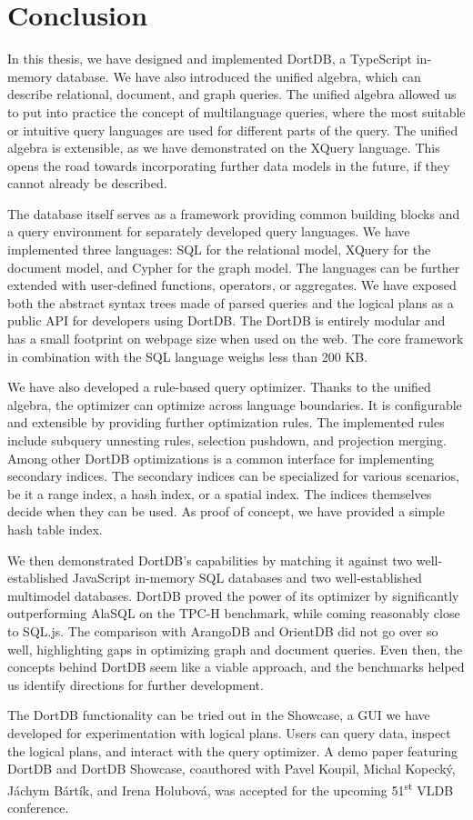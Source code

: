 \chapter*{Conclusion}

In this thesis, we have designed and implemented DortDB, a TypeScript in-memory database. We have also introduced the unified algebra, which can describe relational, document, and graph queries. The unified algebra allowed us to put into practice the concept of multilanguage queries, where the most suitable or intuitive query languages are used for different parts of the query. The unified algebra is extensible, as we have demonstrated on the XQuery language. This opens the road towards incorporating further data models in the future, if they cannot already be described.

The database itself serves as a framework providing common building blocks and a query environment for separately developed query languages. We have implemented three languages: SQL for the relational model, XQuery for the document model, and Cypher for the graph model. The languages can be further extended with user-defined functions, operators, or aggregates. We have exposed both the abstract syntax trees made of parsed queries and the logical plans as a public API for developers using DortDB. The DortDB is entirely modular and has a small footprint on webpage size when used on the web. The core framework in combination with the SQL language weighs less than 200 KB.

We have also developed a rule-based query optimizer. Thanks to the unified algebra, the optimizer can optimize across language boundaries. It is configurable and extensible by providing further optimization rules. The implemented rules include subquery unnesting rules, selection pushdown, and projection merging. Among other DortDB optimizations is a common interface for implementing secondary indices. The secondary indices can be specialized for various scenarios, be it a range index, a hash index, or a spatial index. The indices themselves decide when they can be used. As proof of concept, we have provided a simple hash table index.

We then demonstrated DortDB's capabilities by matching it against two well-established JavaScript in-memory SQL databases and two well-established multimodel databases. DortDB proved the power of its optimizer by significantly outperforming AlaSQL on the TPC-H benchmark, while coming reasonably close to SQL.js. The comparison with ArangoDB and OrientDB did not go over so well, highlighting gaps in optimizing graph and document queries. Even then, the concepts behind DortDB seem like a viable approach, and the benchmarks helped us identify directions for further development.

The DortDB functionality can be tried out in the Showcase, a GUI we have developed for experimentation with logical plans. Users can query data, inspect the logical plans, and interact with the query optimizer. A demo paper featuring DortDB and DortDB Showcase, coauthored with Pavel Koupil, Michal Kopecký, Jáchym Bártík, and Irena Holubová, was accepted for the upcoming 51\textsuperscript{st} VLDB conference.